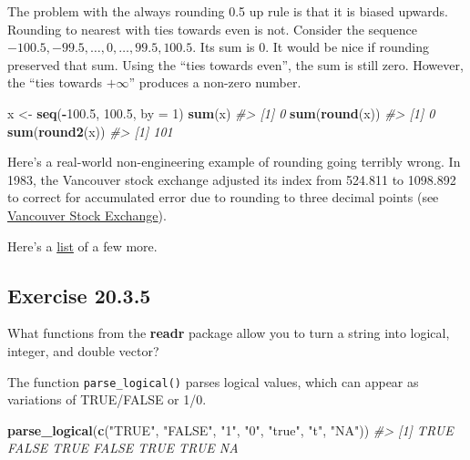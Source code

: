\documentclass[]{book}
\newenvironment{Shaded}{\begin{snugshade}}{\end{snugshade}}
\newcommand{\CommentTok}[1]{\textcolor[rgb]{0.56,0.35,0.01}{\textit{#1}}}
\newcommand{\DataTypeTok}[1]{\textcolor[rgb]{0.13,0.29,0.53}{#1}}
\newcommand{\DecValTok}[1]{\textcolor[rgb]{0.00,0.00,0.81}{#1}}
\newcommand{\FloatTok}[1]{\textcolor[rgb]{0.00,0.00,0.81}{#1}}
\newcommand{\KeywordTok}[1]{\textcolor[rgb]{0.13,0.29,0.53}{\textbf{#1}}}
\newcommand{\NormalTok}[1]{#1}
\newcommand{\OperatorTok}[1]{\textcolor[rgb]{0.81,0.36,0.00}{\textbf{#1}}}
\newcommand{\StringTok}[1]{\textcolor[rgb]{0.31,0.60,0.02}{#1}}
\theoremstyle{plain}
\theoremstyle{remark}
\begin{document}
The problem with the always rounding 0.5 up rule is that it is biased
upwards. Rounding to nearest with ties towards even is not. Consider the
sequence \(-100.5, -99.5, \dots, 0, \dots, 99.5, 100.5\). Its sum is 0.
It would be nice if rounding preserved that sum. Using the ``ties
towards even'', the sum is still zero. However, the ``ties towards
\(+\infty\)'' produces a non-zero number.

\begin{Shaded}
\begin{Highlighting}[]
\NormalTok{x <-}\StringTok{ }\KeywordTok{seq}\NormalTok{(}\OperatorTok{-}\FloatTok{100.5}\NormalTok{, }\FloatTok{100.5}\NormalTok{, }\DataTypeTok{by =} \DecValTok{1}\NormalTok{)}
\KeywordTok{sum}\NormalTok{(x)}
\CommentTok{#> [1] 0}
\KeywordTok{sum}\NormalTok{(}\KeywordTok{round}\NormalTok{(x))}
\CommentTok{#> [1] 0}
\KeywordTok{sum}\NormalTok{(}\KeywordTok{round2}\NormalTok{(x))}
\CommentTok{#> [1] 101}
\end{Highlighting}
\end{Shaded}

Here's a real-world non-engineering example of rounding going terribly
wrong. In 1983, the Vancouver stock exchange adjusted its index from
524.811 to 1098.892 to correct for accumulated error due to rounding to
three decimal points (see
\href{https://en.wikipedia.org/wiki/Vancouver_Stock_Exchange}{Vancouver
Stock Exchange}).

Here's a
\href{https://www.ma.utexas.edu/users/arbogast/misc/disasters.html}{list}
of a few more.

\hypertarget{exercise-20.3.5}{%
\subsection*{\texorpdfstring{Exercise
{20.3.5}}{Exercise 20.3.5}}\label{exercise-20.3.5}}

What functions from the \textbf{readr} package allow you to turn a
string into logical, integer, and double vector?

The function \texttt{parse\_logical()} parses logical values, which can
appear as variations of TRUE/FALSE or 1/0.

\begin{Shaded}
\begin{Highlighting}[]
\KeywordTok{parse_logical}\NormalTok{(}\KeywordTok{c}\NormalTok{(}\StringTok{"TRUE"}\NormalTok{, }\StringTok{"FALSE"}\NormalTok{, }\StringTok{"1"}\NormalTok{, }\StringTok{"0"}\NormalTok{, }\StringTok{"true"}\NormalTok{, }\StringTok{"t"}\NormalTok{, }\StringTok{"NA"}\NormalTok{))}
\CommentTok{#> [1]  TRUE FALSE  TRUE FALSE  TRUE  TRUE    NA}
\end{Highlighting}
\end{Shaded}
\end{document}

